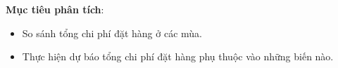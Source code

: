 \hspace{1cm}\textbf{Mục tiêu phân tích}:
\begin{itemize}

    \item So sánh tổng chi phí đặt hàng ở các mùa.
    \item Thực hiện dự báo tổng chi phí đặt hàng phụ thuộc vào những biến nào.
\end{itemize}

